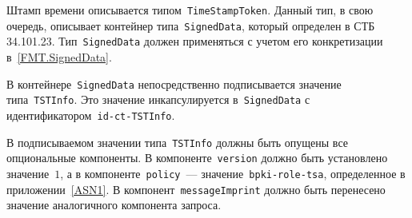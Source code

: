Штамп времени описывается типом~\texttt{TimeStampToken}. 
Данный тип, в свою очередь, описывает контейнер типа~\texttt{SignedData},
который определен в СТБ 34.101.23.
%
Тип~\texttt{SignedData} должен применяться с учетом его 
конкретизации в~\ref{FMT.SignedData}.

В контейнере~\texttt{SignedData} непосредственно подписывается 
значение типа~\texttt{TSTInfo}. Это значение инкапсулируется 
в~\texttt{SignedData} с идентификатором~\texttt{id-ct-TSTInfo}.

В подписываемом значении типа~\texttt{TSTInfo} должны быть опущены
все опциональные компоненты. 
%
В компоненте~\texttt{version} должно быть установлено значение~$1$,
а в компоненте~\texttt{policy}~--- значение~\texttt{bpki-role-tsa},
определенное в приложении~\ref{ASN1}.
%
В компонент~\texttt{messageImprint} должно быть перенесено
значение аналогичного компонента запроса.

